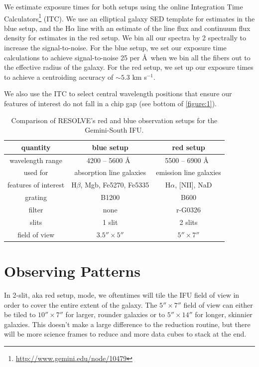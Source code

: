 \documentclass[12pt]{report}
\begin{document}
We estimate exposure times for both setups using the online Integration Time Calculators\footnote{\url{http://www.gemini.edu/node/10479}} (ITC). We use an elliptical galaxy SED template for estimates in the blue setup, and the H$\alpha$ line with an estimate of the line flux and continuum flux density for estimates in the red setup. We bin all our spectra by 2 spectrally to increase the signal-to-noise. For the blue setup, we set our exposure time calculations to achieve signal-to-noise 25 per \AA\ when we bin all the fibers out to the effective radius of the galaxy. For the red setup, we set up our exposure times to achieve a centroiding accuracy of $\sim5.3$ km s$^{-1}$.

We also use the ITC to select central wavelength positions that ensure our features of interest do not fall in a chip gap (see bottom of \autoref{figure:1}).  

\begin{table}
\centering
\begin{tabular}[t]{ccc}
  \hline
quantity  & blue setup & red setup \\ \hline
wavelength range & 4200 -- 5600 \AA\ &  5500 -- 6900 \AA\ \\ 
used for & absorption line galaxies & emission line galaxies \\ 
features of interest & H$\beta$, Mgb, Fe5270, Fe5335 & H$\alpha$, [NII], NaD \\ 
grating & B1200 & B600 \\ 
filter & none & r-G0326 \\
slits & 1 slit & 2 slits \\ 
field of view & $3.5''\times5''$ & $5''\times7''$ \\ \hline
\end{tabular}
\caption[RESOLVE's Observation Setups]{Comparison of RESOLVE's red and blue observation setups for the Gemini-South IFU.}
\label{table:1}
\end{table}

\section{Observing Patterns}
In 2-slit, aka red setup, mode, we oftentimes will tile the IFU field of view in order to cover the entire extent of the galaxy. The $5''\times7''$ field of view can either be tiled to $10''\times7''$ for larger, rounder galaxies or to  $5''\times14''$ for longer, skinnier galaxies. This doesn't make a large difference to the reduction routine, but there will be more science frames to reduce and more data cubes to stack at the end.
\end{document}
